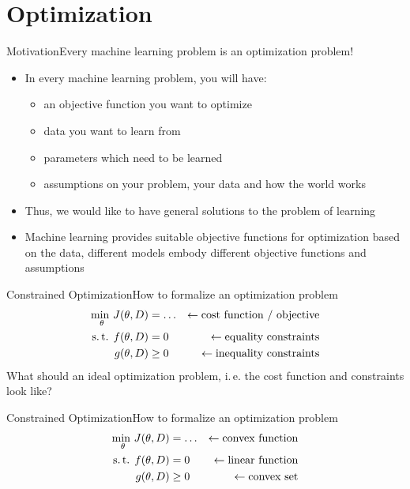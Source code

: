 % 
\begin{frame}{}{}

\end{frame}


\section{Optimization}

% 
\begin{frame}{Motivation}{Every machine learning problem is an optimization problem!}
\begin{itemize}
\item In every machine learning problem, you will have:
\begin{itemize}
\item an objective function you want to optimize
\item data you want to learn from
\item parameters which need to be learned
\item assumptions on your problem, your data and how the world works
\end{itemize}
\item Thus, we would like to have general solutions to the problem of learning
\item Machine learning provides suitable objective functions for optimization based on the data, different models embody different objective functions and assumptions
\end{itemize}
\end{frame}

\begin{frame}{Constrained Optimization}{How to formalize an optimization problem}
	\begin{align*}
		\underset{\theta}{\text{min }} J(\theta, D) &= \dots &\leftarrow\text{cost function / objective}\\
		\text{s.\,t. } f(\theta, D) &= 0 &\leftarrow\text{equality constraints}\\
		g(\theta, D) &\ge 0 &\leftarrow\text{inequality constraints}\\
	\end{align*}
	What should an ideal optimization problem, i.\,e. the cost function and constraints look like?
\end{frame}

\begin{frame}{Constrained Optimization}{How to formalize an optimization problem}
	\begin{align*}
		\underset{\theta}{\text{min }} J(\theta, D) &= \dots &\leftarrow\text{convex function}\\
		\text{s.\,t. } f(\theta, D) &= 0 &\leftarrow\text{linear function}\\
		g(\theta, D) &\ge 0 &\leftarrow\text{convex set}\\
	\end{align*}
\end{frame}

